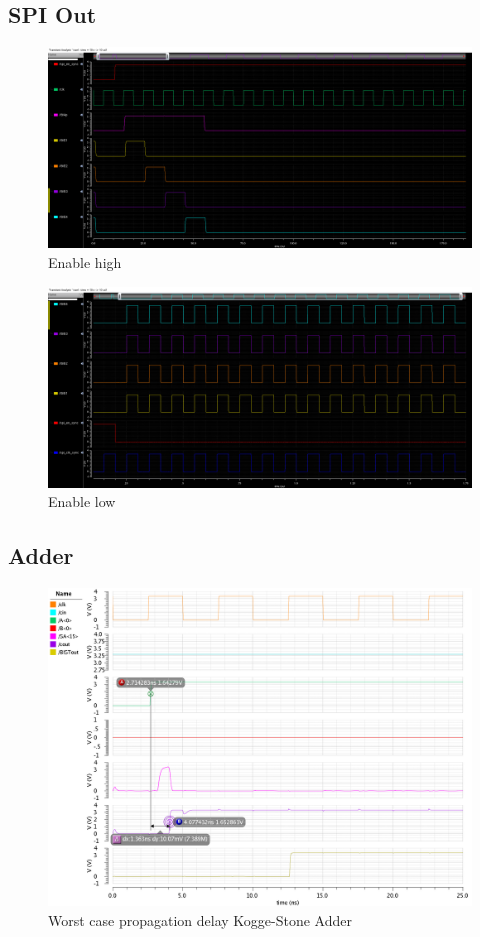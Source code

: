\subsection{SPI Out}

\begin{figure}[H]
  \centering
  \captionsetup{justification=centering}
  \includegraphics[angle=90, scale=0.45]{../figures/spi_out_control}
  \caption{Enable high} \label{fig:G_inv_out}
\end{figure}

\begin{figure}[H]
  \centering
  \captionsetup{justification=centering}
  \includegraphics[angle=90, scale=0.46]{../figures/spi_out_control2}
  \caption{Enable low} \label{fig:G_inv_out}
\end{figure}

\subsection{Adder}

\begin{figure}[H]
  \centering
  \captionsetup{justification=centering}
  \includegraphics[angle=90, scale=1]{../figures/kogge_delay}
  \caption{Worst case propagation delay Kogge-Stone Adder} \label{fig:kogge_delay}
\end{figure}

